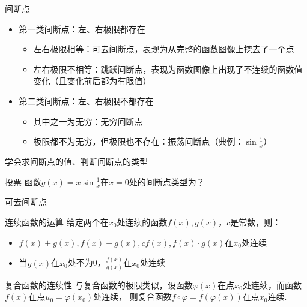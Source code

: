 \documentclass[]{beamer}
\begin{document}
\begin{frame}{间断点}
    \begin{itemize}
        \item 第一类间断点：左、右极限都存在
        \begin{itemize}
            \item 左右极限相等：可去间断点，表现为从完整的函数图像上挖去了一个点
            \item 左右极限不相等：跳跃间断点，表现为函数图像上出现了不连续的函数值变化（且变化前后都为有限值）
        \end{itemize}
        \item 第二类间断点：左、右极限不都存在
        \begin{itemize}
            \item 其中之一为无穷：无穷间断点
            \item 极限都不为无穷，但极限也不存在：振荡间断点（典例：$\sin\frac1x$）
        \end{itemize}
    \end{itemize}
    学会求间断点的值、判断间断点的类型
\end{frame}

\begin{frame}{投票}
    函数$g(x)=x\sin\frac1x$在$x=0$处的间断点类型为？
    
    可去间断点
\end{frame}

\begin{frame}{连续函数的运算}
    给定两个在$x_0$处连续的函数$f(x),g(x)$，$c$是常数，则：
    \begin{itemize}
        \item $f(x)+g(x),f(x)-g(x),cf(x),f(x)\cdot g(x)$在$x_0$处连续
        \item 当$g(x)$在$x_0$处不为0，$\frac{f(x)}{g(x)}$在$x_0$处连续
    \end{itemize}
\end{frame}

\begin{frame}{复合函数的连续性}
    与复合函数的极限类似，设函数$\varphi(x)$在点$x_0$处连续，而函数$f(x)$在点$u_0=\varphi(x_0)$处连续，
    则复合函数$f\circ \varphi =f(\varphi(x))$在点$x_0$连续.
\end{frame}


\end{document}
